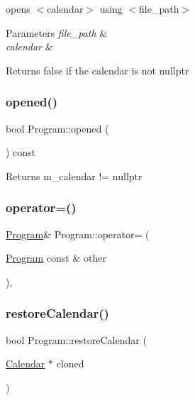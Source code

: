 opens $<$calendar$>$ using $<$file\+\_\+path$>$ 
\begin{DoxyParams}{Parameters}
{\em file\+\_\+path} & \\
\hline
{\em calendar} & \\
\hline
\end{DoxyParams}
\begin{DoxyReturn}{Returns}
false if the calendar is not nullptr 
\end{DoxyReturn}
\mbox{\label{classProgram_a2f494b9e0a50657ac89a61a96e92face}} 
\subsubsection{\texorpdfstring{opened()}{opened()}}
{\footnotesize\ttfamily bool Program\+::opened (\begin{DoxyParamCaption}{ }\end{DoxyParamCaption}) const}

\begin{DoxyReturn}{Returns}
m\+\_\+calendar != nullptr 
\end{DoxyReturn}
\mbox{\label{classProgram_af46704d2258695db8d0bc7d2b5edf48e}} 
\subsubsection{\texorpdfstring{operator=()}{operator=()}}
{\footnotesize\ttfamily \hyperlink{classProgram}{Program}\& Program\+::operator= (\begin{DoxyParamCaption}\item[{\hyperlink{classProgram}{Program} const \&}]{other }\end{DoxyParamCaption})\hspace{0.3cm}{\ttfamily [private]}, {\ttfamily [delete]}}

\mbox{\label{classProgram_a0c4c553237a075bc9ab5d4c6b80b4471}} 
\subsubsection{\texorpdfstring{restore\+Calendar()}{restoreCalendar()}}
{\footnotesize\ttfamily bool Program\+::restore\+Calendar (\begin{DoxyParamCaption}\item[{\hyperlink{classCalendar}{Calendar} $\ast$}]{cloned }\end{DoxyParamCaption})}

